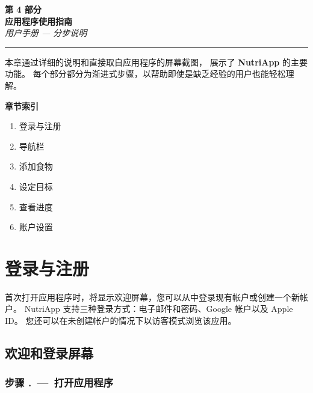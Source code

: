 \documentclass[a4paper,12pt]{article}
\newcounter{passo}[subsection]
\newcommand{\passaggio}[1]{%
    \stepcounter{passo}%
    \subsubsection*{\color{nutriaccent}步骤 \thesubsection.\thepasso\ ---\ #1}%
}
\begin{document}
\begin{center}
  {\Huge\bfseries\color{nutrigreen} 第 4 部分}\\[6pt]
  {\Large\bfseries\color{nutridark} 应用程序使用指南}\\[4pt]
  {\normalsize\itshape\color{nutrigray} 用户手册 --- 分步说明}
\end{center}

\medskip
\noindent\rule{\textwidth}{1.5pt}{\color{nutrigreen}}
\medskip

\noindent 本章通过详细的说明和直接取自应用程序的屏幕截图，
展示了 \textbf{NutriApp} 的主要功能。
每个部分都分为渐进式步骤，以帮助即使是缺乏经验的用户也能轻松理解。

\medskip
\begin{infobox}
  \textbf{\color{nutrigreen}章节索引}
  \begin{enumerate}[leftmargin=1.4em, itemsep=2pt]
    \item 登录与注册
    \item 导航栏
    \item 添加食物
    \item 设定目标
    \item 查看进度
    \item 账户设置
  \end{enumerate}
\end{infobox}

\newpage

\section{登录与注册}

首次打开应用程序时，将显示欢迎屏幕，您可以从中登录现有帐户或创建一个新帐户。
NutriApp 支持三种登录方式：电子邮件和密码、Google 帐户以及 Apple ID。
您还可以在未创建帐户的情况下以访客模式浏览该应用。

\subsection{欢迎和登录屏幕}

\passaggio{打开应用程序}
\end{document}
